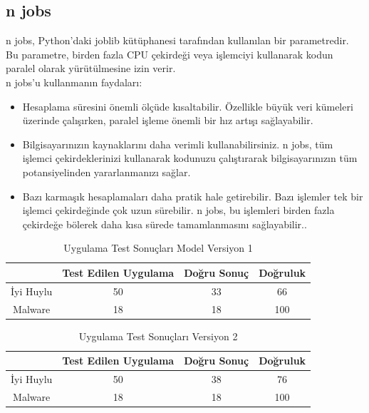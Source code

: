 \documentclass{article}
\begin{document}
\subsection{n jobs}
n jobs, Python'daki joblib kütüphanesi tarafından kullanılan bir parametredir. Bu parametre, birden fazla CPU çekirdeği veya işlemciyi kullanarak kodun paralel olarak yürütülmesine izin verir.\\
n jobs'u kullanmanın faydaları:
\begin{itemize}
    \item Hesaplama süresini önemli ölçüde kısaltabilir. Özellikle büyük veri kümeleri üzerinde çalışırken, paralel işleme önemli bir hız artışı sağlayabilir.
    \item Bilgisayarınızın kaynaklarını daha verimli kullanabilirsiniz. n jobs, tüm işlemci çekirdeklerinizi kullanarak kodunuzu çalıştırarak bilgisayarınızın tüm potansiyelinden yararlanmanızı sağlar.
     \item Bazı karmaşık hesaplamaları daha pratik hale getirebilir. Bazı işlemler tek bir işlemci çekirdeğinde çok uzun sürebilir. n jobs, bu işlemleri birden fazla çekirdeğe bölerek daha kısa sürede tamamlanmasını sağlayabilir..
\end{itemize}

 \begin{table}
    \centering
\caption{Uygulama Test Sonuçları Model Versiyon 1}
\label{tab:my_label}
    \begin{tabular}{|c|c|c|c|} \hline 
         & Test Edilen Uygulama  & Doğru Sonuç   & Doğruluk\\ \hline 
        İyi Huylu & 50  & 33 & 66 \\ \hline 
        Malware & 18 & 18 & 100 \\ \hline
    \end{tabular}
\end{table}

\begin{table}
    \centering
\caption{Uygulama Test Sonuçları Versiyon 2 }
\label{tab:my_label}
    \begin{tabular}{|c|c|c|c|} \hline 
         & Test Edilen Uygulama  & Doğru Sonuç   & Doğruluk\\ \hline 
        İyi Huylu & 50  & 38 & 76 \\ \hline 
        Malware & 18 & 18 & 100 \\ \hline
    \end{tabular}
\end{table}  
\end{document}
